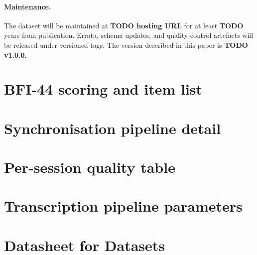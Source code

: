 \documentclass{article}
\begin{document}
\paragraph{Maintenance.}
The dataset will be maintained at \textbf{TODO hosting URL} for at least
\textbf{TODO} years from publication.
Errata, schema updates, and quality-control artefacts will be released under
versioned tags.
The version described in this paper is \textbf{TODO v1.0.0}.





\appendix

\section{BFI-44 scoring and item list}
\label{app:bfi44}

\section{Synchronisation pipeline detail}
\label{app:sync}

\section{Per-session quality table}
\label{app:quality}

\section{Transcription pipeline parameters}
\label{app:transcript}

\section{Datasheet for Datasets}
\label{app:datasheet}
\end{document}
